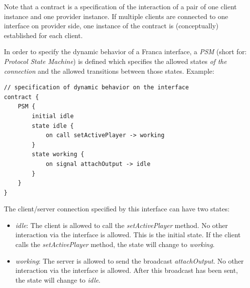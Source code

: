 \documentclass[a4paper,10pt]{scrreprt}
\newlength{\XdocItemIndent}
\begin{document}
Note that a contract is a specification of the interaction of a pair
of one client instance and one provider instance. If multiple clients
are connected to one interface on provider side, one instance of the
contract is (conceptually) established for each client. 

In order to specify the dynamic behavior of a Franca interface, 
a \textit{PSM} (short for: \textit{Protocol State Machine}) is defined which specifies 
the allowed states \textit{of the connection} and the allowed transitions between those
states. Example:


\begin{lstlisting}[language=Franca]
// specification of dynamic behavior on the interface 
contract {
	PSM {
		initial idle
		state idle {
			on call setActivePlayer -> working
		}
		state working {
			on signal attachOutput -> idle
		}
	}
}
\end{lstlisting}

The client/server connection specified by this interface can have two states:
\setlength{\XdocItemIndent}{\textwidth}
\begin{itemize}
\addtolength{\XdocItemIndent}{-2.5em}
\item \begin{minipage}[t]{\XdocItemIndent}
\textit{idle}: The client is allowed to call the \textit{setActivePlayer} method.
		No other interaction via the interface is allowed.
		This is the initial state.
		If the client calls the \textit{setActivePlayer} method, the state will change to \textit{working}.

\end{minipage}
\item \begin{minipage}[t]{\XdocItemIndent}
\textit{working}: The server is allowed to send the broadcast \textit{attachOutput}.
		No other interaction via the interface is allowed.
		After this broadcast has been sent, the state will change to \textit{idle}. 

\end{minipage}
\end{itemize}
\addtolength{\XdocItemIndent}{2.5em}
\end{document}
